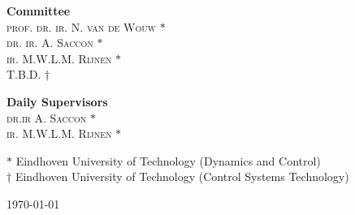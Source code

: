 \documentclass[DC2017114Bouma.tex]{subfiles}
\begin{document}
\begin{minipage}[t]{0.4\textwidth}
	\begin{flushleft} 
		\textbf{Committee}\\
		\textsc{prof. dr. ir. N. van de Wouw} $*$\\
		\textsc{dr. ir. A. Saccon} $*$\\
		\textsc{ir. M.W.L.M. Rijnen} $*$\\
		\textsc{T.B.D.} $\dagger$
	\end{flushleft}
\end{minipage}
\hfill
\begin{minipage}[t]{0.4\textwidth}
	\begin{flushright} 
		\textbf{Daily Supervisors}\\
		\textsc{dr.ir A. Saccon} $*$\\
		\textsc{ir. M.W.L.M. Rijnen} $*$\\
	\end{flushright}
\end{minipage}
\vfill

{\small $*$ Eindhoven University of Technology (Dynamics and Control)}\\
{\small $\dagger$ Eindhoven University of Technology (Control Systems Technology)}
\bigskip

\today
\end{document}
